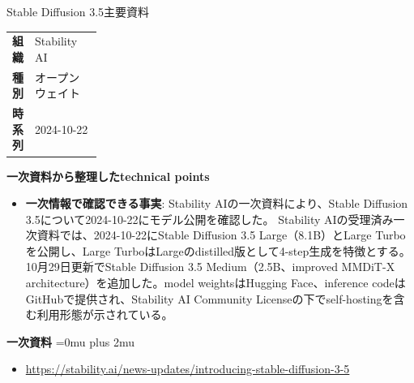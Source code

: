 \begin{technicalnote}{Stable Diffusion 3.5}{主要資料}
\begingroup
\begin{tabularx}{\linewidth}{@{}>{\bfseries}p{0.22\linewidth}X@{}}
組織 & Stability AI \\
種別 & オープンウェイト \\
時系列 & 2024-10-22 \\
\end{tabularx}
\smallskip
{\bfseries 一次資料から整理したtechnical points}
\begin{itemize}[leftmargin=1.5em,itemsep=0.35em]
\item \textbf{一次情報で確認できる事実}: Stability AIの一次資料により、Stable Diffusion 3.5について2024-10-22にモデル公開を確認した。 Stability AIの受理済み一次資料では、2024-10-22にStable Diffusion 3.5 Large（8.1B）とLarge Turboを公開し、Large TurboはLargeのdistilled版として4-step生成を特徴とする。10月29日更新でStable Diffusion 3.5 Medium（2.5B、improved MMDiT-X architecture）を追加した。model weightsはHugging Face、inference codeはGitHubで提供され、Stability AI Community Licenseの下でself-hostingを含む利用形態が示されている。
\end{itemize}
\begin{minipage}{\linewidth}
\begin{samepage}
{\bfseries 一次資料}
\begingroup\sloppy
\Urlmuskip=0mu plus 2mu\relax
\begin{itemize}[leftmargin=1.5em,itemsep=0.25em]
\item {\scriptsize\url{https://stability.ai/news-updates/introducing-stable-diffusion-3-5}}
\end{itemize}
\endgroup
\end{samepage}
\end{minipage}
\endgroup
\end{technicalnote}
\medskip

